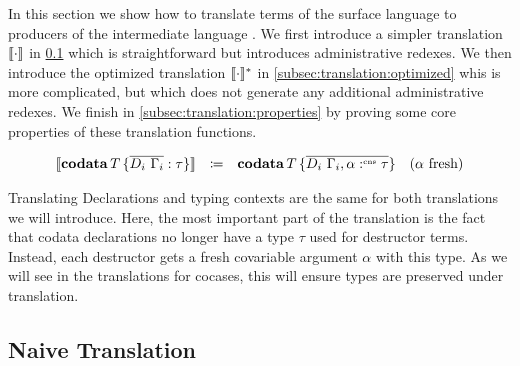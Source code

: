 In this section we show how to translate terms of the surface language \surfacelang{} to producers of the intermediate language \targetlang.
We first introduce a simpler translation $\llbracket \cdot \rrbracket$ in \cref{subsec:translation:naive} which is straightforward but introduces administrative redexes.
We then introduce the optimized translation $\llbracket \cdot \rrbracket_{}^{\ast}$ in \cref{subsec:translation:optimized} whis is more complicated, but which does not generate
any additional administrative redexes.
We finish in \cref{subsec:translation:properties} by proving some core properties of these translation functions.

\[
  \begin{array}{rcll}
    \llbracket \mathbf{codata}\, T\, \{ \overline{D_i\ \Gamma_i} : \tau \} \rrbracket{} & \coloneq & \mathbf{codata}\, T\, \{ \overline{D_i\ \Gamma_i,\alpha:^{\text{\tiny cns}}\tau} \} & (\alpha\text{ fresh})\\
  \end{array}
\]

Translating Declarations and typing contexts are the same for both translations we will introduce.
Here, the most important part of the translation is the fact that codata declarations no longer have a type $\tau$ used for destructor terms.
Instead, each destructor gets a fresh covariable argument $\alpha$ with this type.
As we will see in the translations for cocases, this will ensure types are preserved under translation.

\subsection{Naive Translation}
\label{subsec:translation:naive}

